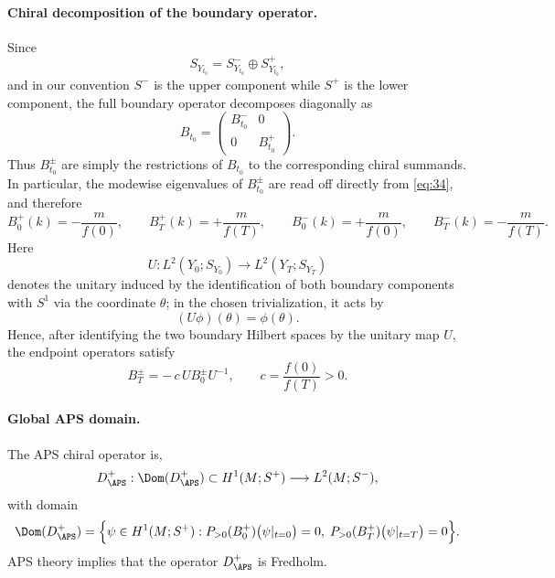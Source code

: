 \documentclass[11pt]{article}
\theoremstyle{definition}
\numberwithin{equation}{section}
\begin{document}
\paragraph{Chiral decomposition of the boundary operator.}
Since
\begin{equation}
S_{Y_{t_0}}=S^-_{Y_{t_0}}\oplus S^+_{Y_{t_0}},
\end{equation}
and in our convention \(S^-\) is the upper component while \(S^+\) is the lower component, the full boundary operator decomposes diagonally as
\begin{equation}
B_{t_0}
=
\begin{pmatrix}
B_{t_0}^- & 0\\
0 & B_{t_0}^+
\end{pmatrix}.
\end{equation}
Thus \(B_{t_0}^\pm\) are simply the restrictions of \(B_{t_0}\) to the corresponding chiral summands. In particular, the modewise eigenvalues of \(B_{t_0}^\pm\) are read off directly from \eqref{eq:34}, and therefore
\begin{equation}
\label{eq:B0BTpm-rewrite}
B_0^+(k)=-\frac{m}{f(0)},
\qquad
B_T^+(k)=+\frac{m}{f(T)},
\qquad
B_0^-(k)=+\frac{m}{f(0)},
\qquad
B_T^-(k)=-\frac{m}{f(T)}.
\end{equation}
Here
\begin{equation}
U:L^2(Y_0;S_{Y_0})\longrightarrow L^2(Y_T;S_{Y_T})
\end{equation}
denotes the unitary induced by the identification of both boundary components with
\(S^1\) via the coordinate \(\theta\); in the chosen trivialization, it acts by
\begin{equation}
(U\phi)(\theta)=\phi(\theta).
\end{equation}
Hence, after identifying the two boundary Hilbert spaces by the unitary map $U$, the endpoint operators satisfy
\begin{equation}
\label{eq:BT-cB0-unitary}
B_T^\pm=-\,c\,U B_0^\pm U^{-1},
\qquad
c=\frac{f(0)}{f(T)}>0.
\end{equation}

\paragraph{Global APS domain.}

The APS chiral operator is,
\begin{equation}
D^+_{\APS}:\Dom(D^+_{\APS})\subset H^1(M;S^+)\longrightarrow L^2(M;S^-),
\end{equation}
with domain
\begin{equation}
\label{eq:global-aps-domain}
\Dom(D^+_{\APS})
=
\Bigl\{
\psi\in H^1(M;S^+):
P_{>0}(B_0^+)\bigl(\psi|_{t=0}\bigr)=0,\;
P_{>0}(B_T^+)\bigl(\psi|_{t=T}\bigr)=0
\Bigr\}.
\end{equation}
APS theory implies that the operator \(D^+_{\APS}\) is Fredholm.
\end{document}
